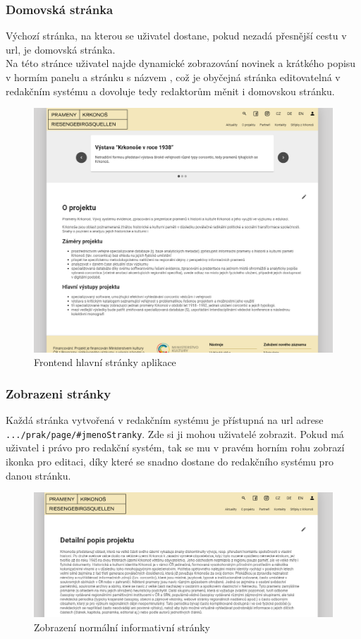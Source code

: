 \subsubsection{Domovská stránka}
Výchozí stránka, na kterou se uživatel dostane, pokud nezadá přesnější cestu v url, je domovská stránka.\\
Na této stránce uživatel najde dynamické zobrazování novinek a krátkého popisu v hormím panelu a stránku
s názvem , což je obyčejná stránka editovatelná v redakčním systému a dovoluje tedy
redaktorům měnit i domovskou stránku.
\begin{figure}[H]
	\centering
	\includegraphics[width=.8\linewidth]{img/homeScene.png}
	\caption{Frontend hlavní stránky aplikace}
\end{figure}

\subsubsection{Zobrazeni stránky}
Každá stránka vytvořená v redakčním systému je přístupná na url adrese \texttt{.../prak/page/\#jmenoStranky}.
Zde si ji mohou uživatelé zobrazit. Pokud má uživatel i právo pro redakční systém,
tak se mu v pravém horním rohu zobrazí ikonka pro editaci, díky které se snadno dostane do
redakčního systému pro danou stránku.
\begin{figure}[H]
	\centering
	\includegraphics[width=.8\linewidth]{img/pageScene.png}
	\caption{Zobrazení normální informativní stránky}
\end{figure}

